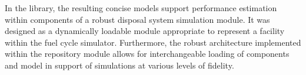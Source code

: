 In the \Cyder library, the resulting concise models support performance 
estimation within components of a robust disposal system simulation module. It 
was designed as a dynamically loadable module appropriate to represent a 
facility within the \Cyclus fuel cycle simulator. Furthermore, the robust 
architecture implemented within the repository module allows for 
interchangeable loading of components and model in support of simulations at 
various levels of fidelity.




%







